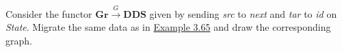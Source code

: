 Consider the functor $\mathbf{Gr}\xrightarrow{G}\mathbf{DDS}$ given by sending \emph{src} to \emph{next} and \emph{tar} to \emph{id} on \emph{State}. Migrate the same data as in \href{doc/1 math/Seven Sketches in Compositionality/Chapter 3: Databases/4 Adjunctions and data migration/1 Pulling back data along a functor/2 DDS pullback}{Example 3.65} and draw the corresponding graph.\textcolor{white}{NOCARD}